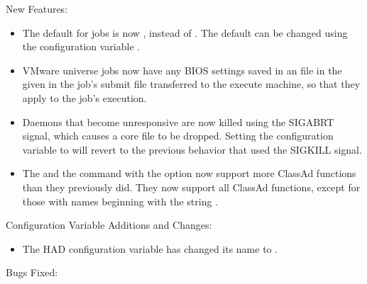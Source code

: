 \noindent New Features:

\begin{itemize}

\item The default  for jobs is now 
, instead of .
The default can be changed using the configuration variable
.

\item VMware  universe jobs now have any BIOS settings saved in
an  file in the  given in the
job's submit file transferred to the execute machine, so that they
apply to the job's execution.

\item Daemons that become unresponsive are now killed using the
SIGABRT signal, which causes a core file to be dropped.
Setting the configuration variable 
to  will revert to the previous behavior that used
the SIGKILL signal.

\item The  and the
 command with the  option now
support more ClassAd functions than they previously did.  They now
support all ClassAd functions, except for those with names beginning
with the string .

\end{itemize}

\noindent Configuration Variable Additions and Changes:

\begin{itemize}

\item The HAD configuration variable 
has changed its name to .

\end{itemize}

\noindent Bugs Fixed:

